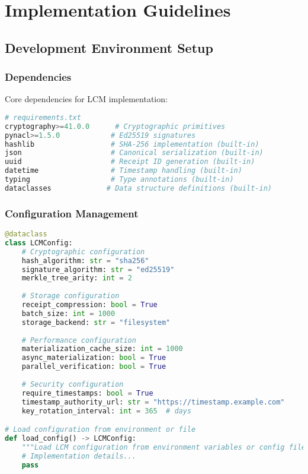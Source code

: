 \documentclass[12pt,a4paper]{article}
\begin{document}
\section{Implementation Guidelines}

\subsection{Development Environment Setup}

\subsubsection{Dependencies}

Core dependencies for LCM implementation:

\begin{lstlisting}[language=Python, caption=Python Dependencies]
# requirements.txt
cryptography>=41.0.0      # Cryptographic primitives
pynacl>=1.5.0            # Ed25519 signatures
hashlib                  # SHA-256 implementation (built-in)
json                     # Canonical serialization (built-in)
uuid                     # Receipt ID generation (built-in)
datetime                 # Timestamp handling (built-in)
typing                   # Type annotations (built-in)
dataclasses             # Data structure definitions (built-in)
\end{lstlisting}

\subsubsection{Configuration Management}

\begin{lstlisting}[language=Python, caption=LCM Configuration]
@dataclass
class LCMConfig:
    # Cryptographic configuration
    hash_algorithm: str = "sha256"
    signature_algorithm: str = "ed25519"
    merkle_tree_arity: int = 2
    
    # Storage configuration
    receipt_compression: bool = True
    batch_size: int = 1000
    storage_backend: str = "filesystem"
    
    # Performance configuration
    materialization_cache_size: int = 1000
    async_materialization: bool = True
    parallel_verification: bool = True
    
    # Security configuration
    require_timestamps: bool = True
    timestamp_authority_url: str = "https://timestamp.example.com"
    key_rotation_interval: int = 365  # days

# Load configuration from environment or file
def load_config() -> LCMConfig:
    """Load LCM configuration from environment variables or config file"""
    # Implementation details...
    pass
\end{lstlisting}
\end{document}
